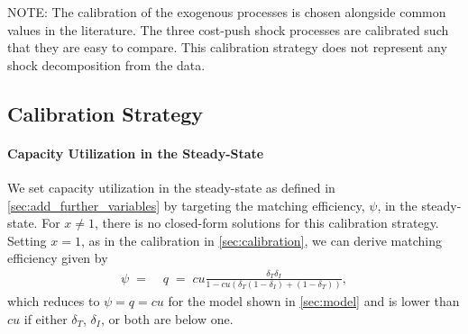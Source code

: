 \documentclass[12pt,3p,authoryear,review]{elsarticle}
\begin{document}
\begin{small}
\begin{table}
\begin{center}
\begin{threeparttable}
\begin{scriptsize}
\begin{tabular}{l@{\hskip 12pt}c@{\hskip 36pt}l@{\hskip 12pt}c}
					\hline%
				\end{tabular}%
			\end{scriptsize}%
			\begin{tablenotes}%
				\item \tiny NOTE: The calibration of the exogenous processes is chosen alongside common values in the literature. The three cost-push shock processes are calibrated such that they are easy to compare. This calibration strategy does not represent any shock decomposition from the data.%
			\end{tablenotes}%
		\end{threeparttable}
	\end{center}%
\end{table}%
\pagebreak%
\subsection{Calibration Strategy}\label{sec:add_calibration_strategy}%
\paragraph{Capacity Utilization in the Steady-State}%
We set capacity utilization in the steady-state as defined in \ref{sec:add_further_variables} by targeting the matching efficiency, $\psi$, in the steady-state. For $x \neq 1$, there is no closed-form solutions for this calibration strategy. Setting $x=1$, as in the calibration in \cref{sec:calibration}, we can derive matching efficiency given by%
\begin{align}%
	\psi \; = & \; q \; = \; cu \frac{\delta_T \delta_I}{1 - cu \left(\delta_T\left(1-\delta_I\right)+\left(1-\delta_T\right)\right)},%
\end{align}%
which reduces to $\psi = q = cu$ for the model shown in \cref{sec:model} and is lower than $cu$ if either $\delta_T$, $\delta_I$, or both are below one.%

\end{small}
\end{document}
